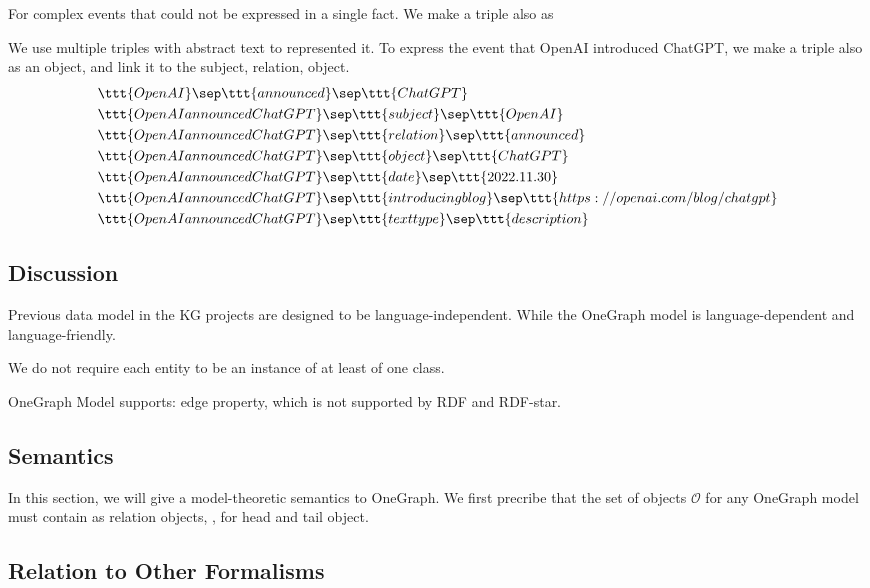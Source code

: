 For complex events that could not be expressed in a single fact. We make a triple also as   

We use multiple triples with abstract text to represented it. To express the event that OpenAI introduced ChatGPT, we make a triple also as an object, and link it to the subject, relation, object. 
\begin{align}
& \ttt{OpenAI} \sep \ttt{announced} \sep \ttt{ChatGPT} \nonumber \\
& \ttt{OpenAI announced ChatGPT} \sep \ttt{subject} \sep \ttt{OpenAI} \\
& \ttt{OpenAI announced ChatGPT} \sep \ttt{relation} \sep \ttt{announced} \\
& \ttt{OpenAI announced ChatGPT} \sep \ttt{object} \sep \ttt{ChatGPT} \\
& \ttt{OpenAI announced ChatGPT} \sep \ttt{date} \sep \ttt{2022.11.30} \\
& \ttt{OpenAI announced ChatGPT} \sep \ttt{introducing blog} \sep \ttt{https://openai.com/blog/chatgpt} \nonumber \\ 
& \ttt{OpenAI announced ChatGPT} \sep \ttt{text type} \sep \ttt{description} \\
\end{align}


 

\subsection{Discussion}
Previous data model in the KG projects are designed to be language-independent. While the OneGraph model is language-dependent and language-friendly.

We do not require each entity to be an instance of at least of one class. 

OneGraph Model supports: edge property, which is not supported by RDF and RDF-star. 






\subsection{Semantics}
In this section, we will give a model-theoretic semantics to OneGraph. We first precribe that the set of objects $\mathcal{O}$ for any OneGraph model must contain   as relation objects, ,  for head and tail object. 

\subsection{Relation to Other Formalisms}
